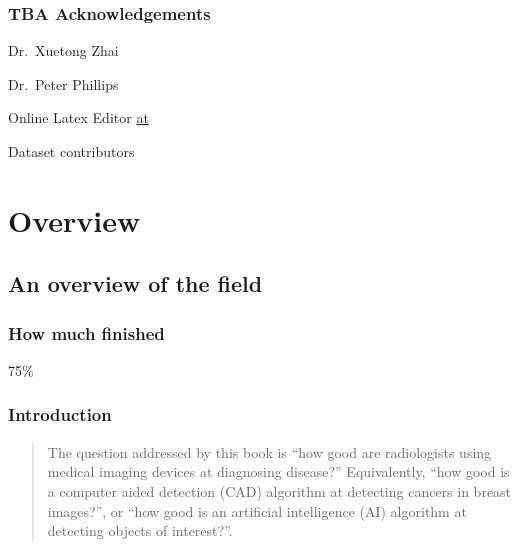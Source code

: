 \documentclass[
]{book}
\begin{document}
\hypertarget{tba-acknowledgements}{%
\section{TBA Acknowledgements}\label{tba-acknowledgements}}

Dr.~Xuetong Zhai

Dr.~Peter Phillips

Online Latex Editor \href{https://latexeditor.lagrida.com/}{at}

Dataset contributors

\hypertarget{part-overview}{%
\part*{Overview}\label{part-overview}}

\hypertarget{overview}{%
\chapter{An overview of the field}\label{overview}}

\hypertarget{overview-how-much-finished}{%
\section{How much finished}\label{overview-how-much-finished}}

75\%

\hypertarget{preliminaries-intro}{%
\section{Introduction}\label{preliminaries-intro}}

\begin{quote}
The question addressed by this book is ``how good are radiologists using medical imaging devices at diagnosing disease?'' Equivalently, ``how good is a computer aided detection (CAD) algorithm at detecting cancers in breast images?'', or ``how good is an artificial intelligence (AI) algorithm at detecting objects of interest?''.
\end{quote}
\end{document}
